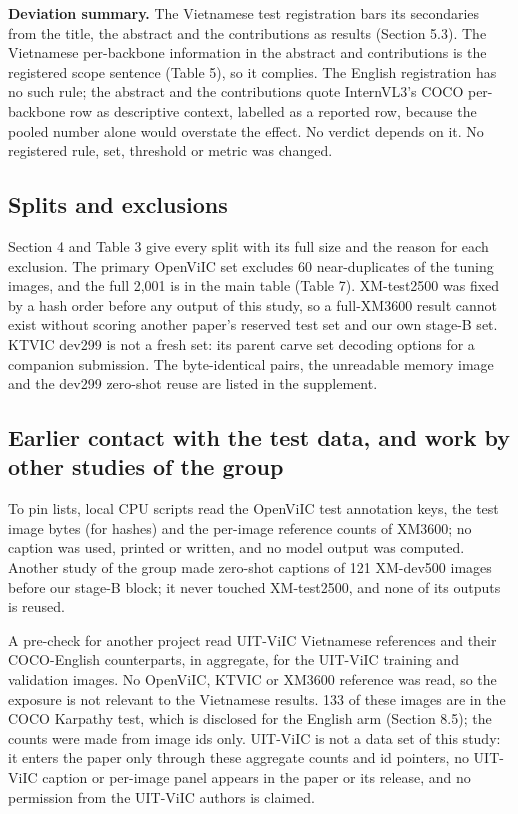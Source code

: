 \documentclass[manuscript,screen]{acmart}
\begin{document}
\textbf{Deviation summary.} The Vietnamese test registration bars its secondaries from the title,
the abstract and the contributions as results (Section 5.3). The Vietnamese per-backbone information
in the abstract and contributions is the registered scope sentence (Table 5), so it complies. The
English registration has no such rule; the abstract and the contributions quote InternVL3's COCO
per-backbone row as descriptive context, labelled as a reported row, because the pooled number alone
would overstate the effect. No verdict depends on it. No registered rule, set, threshold or metric
was changed.

\subsection{Splits and exclusions}\label{splits-and-exclusions}

Section 4 and Table 3 give every split with its full size and the reason for each exclusion. The
primary OpenViIC set excludes 60 near-duplicates of the tuning images, and the full 2,001 is in the
main table (Table 7). XM-test2500 was fixed by a hash order before any output of this study, so a
full-XM3600 result cannot exist without scoring another paper's reserved test set and our own
stage-B set. KTVIC dev299 is not a fresh set: its parent carve set decoding options for a companion
submission. The byte-identical pairs, the unreadable memory image and the dev299 zero-shot reuse are
listed in the supplement.

\subsection{Earlier contact with the test data, and work by other studies of the
group}\label{earlier-contact-with-the-test-data-and-work-by-other-studies-of-the-group}

To pin lists, local CPU scripts read the OpenViIC test annotation keys, the test image bytes (for
hashes) and the per-image reference counts of XM3600; no caption was used, printed or written, and
no model output was computed. Another study of the group made zero-shot captions of 121 XM-dev500
images before our stage-B block; it never touched XM-test2500, and none of its outputs is reused.

A pre-check for another project read UIT-ViIC Vietnamese references and their COCO-English
counterparts, in aggregate, for the UIT-ViIC training and validation images. No OpenViIC, KTVIC or
XM3600 reference was read, so the exposure is not relevant to the Vietnamese results. 133 of these
images are in the COCO Karpathy test, which is disclosed for the English arm (Section 8.5); the
counts were made from image ids only. UIT-ViIC is not a data set of this study: it enters the paper
only through these aggregate counts and id pointers, no UIT-ViIC caption or per-image panel appears
in the paper or its release, and no permission from the UIT-ViIC authors is claimed.
\end{document}
